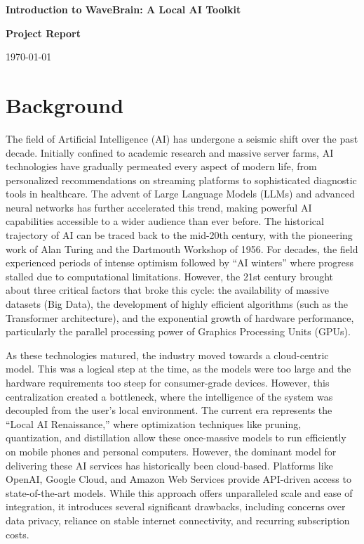 \documentclass[12pt,a4paper]{article}
\begin{document}
\begin{titlepage}
    \centering
    \vspace*{2cm}
    {\Huge \textbf{Introduction to WaveBrain: A Local AI Toolkit} \par}
    \vspace{1.5cm}
    {\Large \textbf{Project Report} \par}
    \vfill
    {\large \today \par}
\end{titlepage}

\newpage

\section{Background}
The field of Artificial Intelligence (AI) has undergone a seismic shift over the past decade. Initially confined to academic research and massive server farms, AI technologies have gradually permeated every aspect of modern life, from personalized recommendations on streaming platforms to sophisticated diagnostic tools in healthcare. The advent of Large Language Models (LLMs) and advanced neural networks has further accelerated this trend, making powerful AI capabilities accessible to a wider audience than ever before. The historical trajectory of AI can be traced back to the mid-20th century, with the pioneering work of Alan Turing and the Dartmouth Workshop of 1956. For decades, the field experienced periods of intense optimism followed by ``AI winters'' where progress stalled due to computational limitations. However, the 21st century brought about three critical factors that broke this cycle: the availability of massive datasets (Big Data), the development of highly efficient algorithms (such as the Transformer architecture), and the exponential growth of hardware performance, particularly the parallel processing power of Graphics Processing Units (GPUs).

As these technologies matured, the industry moved towards a cloud-centric model. This was a logical step at the time, as the models were too large and the hardware requirements too steep for consumer-grade devices. However, this centralization created a bottleneck, where the intelligence of the system was decoupled from the user's local environment. The current era represents the ``Local AI Renaissance,'' where optimization techniques like pruning, quantization, and distillation allow these once-massive models to run efficiently on mobile phones and personal computers. However, the dominant model for delivering these AI services has historically been cloud-based. Platforms like OpenAI, Google Cloud, and Amazon Web Services provide API-driven access to state-of-the-art models. While this approach offers unparalleled scale and ease of integration, it introduces several significant drawbacks, including concerns over data privacy, reliance on stable internet connectivity, and recurring subscription costs. 
\end{document}
